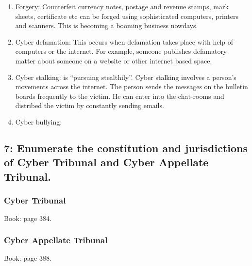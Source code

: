 \documentclass[14 pt, letterpaper]{extarticle}
\begin{document}
\begin{justify}
\begin{enumerate}
			\item Forgery: Counterfeit currency notes, postage and revenue stamps, mark sheets, certificate etc can be forged using sophisticated computers, printers and scanners. This is becoming a booming business nowdays.
			\item Cyber defamation: This occurs when defamation takes place with help of computers or the internet. For example, someone publishes defamatory matter about someone on a website or other internet based space.
			\item Cyber stalking: is \enquote{pursuing stealthily}. Cyber stalking involves a person's movements across the internet. The person sends the messages on the bulletin boards frequently to the victim. He can enter into the chat-rooms and distribed the victim by constantly sending emails.
			\item Cyber bullying:
		\end{enumerate}
	
	\subsection*{7: Enumerate the constitution and jurisdictions of Cyber Tribunal and Cyber Appellate Tribunal.}
	\subsubsection*{Cyber Tribunal}
	Book: page 384.
	
	\subsubsection{Cyber Appellate Tribunal}
	Book: page 388.
		
	\end{justify}
	
\end{document}
